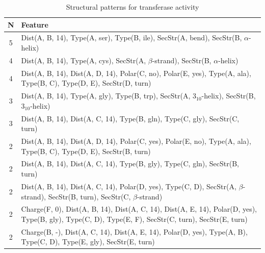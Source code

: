 \documentclass[11pt,twoside,a4paper]{book}
\begin{document}
\begin{table}\begin{tabularx}{\textwidth}{cX}\textbf{N} & \textbf{Feature} \\ \hline  
5 & Dist(A, B, 14),  Type(A, ser), Type(B, ile), SecStr(A, bend), SecStr(B, $\alpha$-helix)\\ \hline 
4 & Dist(A, B, 14),  Type(A, cys), SecStr(A, $\beta$-strand), SecStr(B, $\alpha$-helix)\\ \hline 
4 & Dist(A, B, 14), Dist(A, D, 14), Polar(C, no), Polar(E, yes),  Type(A, ala), \newline Type(B, C), Type(D, E), SecStr(D, turn)\\ \hline 
3 & Dist(A, B, 14),  Type(A, gly), Type(B, trp), SecStr(A, $3_{10}$-helix), SecStr(B, $3_{10}$-helix)\\ \hline 
3 & Dist(A, B, 14), Dist(A, C, 14),  Type(B, gln), Type(C, gly), SecStr(C, turn)\\ \hline 
2 & Dist(A, B, 14), Dist(A, D, 14), Polar(C, yes), Polar(E, no),  Type(A, ala), \newline Type(B, C), Type(D, E), SecStr(B, turn)\\ \hline 
2 & Dist(A, B, 14), Dist(A, C, 14),  Type(B, gly), Type(C, gln), SecStr(B, turn)\\ \hline 
2 & Dist(A, B, 14), Dist(A, C, 14), Polar(D, yes),  Type(C, D), SecStr(A, $\beta$-strand), \newline SecStr(B, turn), SecStr(C, $\beta$-strand)\\ \hline 
2 & Charge(F, 0), Dist(A, B, 14), Dist(A, C, 14), Dist(A, E, 14), Polar(D, yes),  \newline Type(B, gly), Type(C, D), Type(E, F), SecStr(C, turn), SecStr(E, turn)\\ \hline 
2 & Charge(B, -), Dist(A, C, 14), Dist(A, E, 14), Polar(D, yes),  Type(A, B), Type(C, D), Type(E, gly), SecStr(E, turn)\\ \hline 
 \end{tabularx}\caption{Structural patterns for transferase activity}\label{tab:transferase_activity}\end{table}
\end{document}

